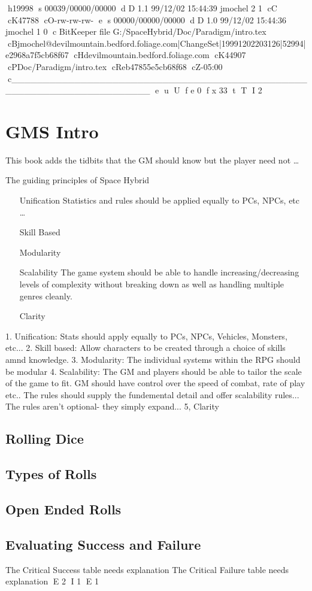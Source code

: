 h19998
s 00039/00000/00000
d D 1.1 99/12/02 15:44:39 jmochel 2 1
cC
cK47788
cO-rw-rw-rw-
e
s 00000/00000/00000
d D 1.0 99/12/02 15:44:36 jmochel 1 0
c BitKeeper file G:/SpaceHybrid/Doc/Paradigm/intro.tex
cBjmochel@devilmountain.bedford.foliage.com|ChangeSet|19991202203126|52994|e2968a7f5cb68f67
cHdevilmountain.bedford.foliage.com
cK44907
cPDoc/Paradigm/intro.tex
cReb47855e5cb68f68
cZ-05:00
c______________________________________________________________________
e
u
U
f e 0
f x 33
t
T
I 2
\chapter{GMS Intro}

This book adds the tidbits that the GM should know but the 
player need not \dots

The guiding principles of Space Hybrid\ 

\begin{enumerate}
\item[Unification] Statistics and rules should be applied equally to
PCs, NPCs, etc \dots
\item[Skill Based] 
\item[Modularity]
\item[Scalability] The game system should be able to handle 
increasing/decreasing levels of complexity without breaking down
as well as handling multiple genres cleanly.
\item[Clarity]
\end{enumerate}

1. Unification: Stats should apply equally to PCs, NPCs, Vehicles, Monsters, etc...
2. Skill based: Allow characters to be created through a choice of skills amnd
knowledge.
3. Modularity: The individual systems within the RPG should be modular
4. Scalability: The GM and players should be able to tailor the scale
of the game to fit. GM should have control over the speed of combat,
rate of play etc.. The rules should supply the fundemental detail
and offer scalability rules... The rules aren't optional- they simply
expand...
5, Clarity

\section{Rolling Dice}

\section{Types of Rolls}

\section{Open Ended Rolls}

\section{Evaluating Success and Failure}

The Critical Success table needs explanation
The Critical Failure table needs explanation
E 2
I 1
E 1
